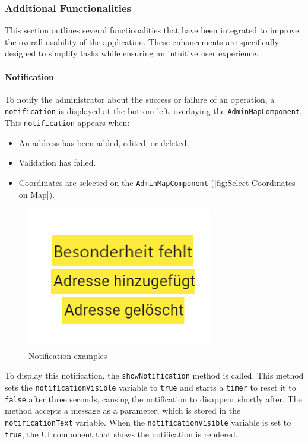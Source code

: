 \newpage


\subsubsection{Additional Functionalities}
    This section outlines several functionalities that have been integrated to improve the overall usability of the application. These enhancements are specifically designed to simplify tasks while ensuring an intuitive user experience.

\paragraph*{Notification}
\label{fig:Notification}

    To notify the administrator about the success or failure of an operation, a \texttt{notification} is displayed at the bottom left, overlaying the \texttt{AdminMapComponent}. This \texttt{notification} appears when:

    \begin{itemize}
        \item An address has been added, edited, or deleted.
        \item Validation has failed.
        \item Coordinates are selected on the \texttt{AdminMapComponent} (\ref{fig:Select Coordinates on Map}).
    \end{itemize}


\begin{figure}[H]
    \centering
    \includegraphics[width=0.4\linewidth]{images/AdminPanel/NotificationExamples.png}
    \caption{Notification examples}
\end{figure}

To display this notification, the \texttt{showNotification} method is called. This method sets the \texttt{notificationVisible} variable to \texttt{true} and starts a \texttt{timer} to reset it to \texttt{false} after three seconds, causing the notification to disappear shortly after. The method accepts a message as a parameter, which is stored in the \texttt{notificationText} variable. When the \texttt{notificationVisible} variable is set to \texttt{true}, the UI component that shows the notification is rendered.

